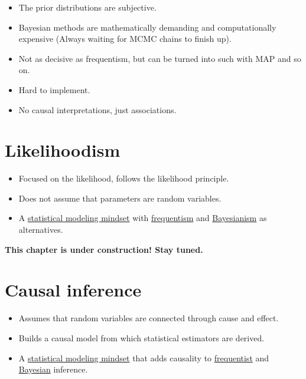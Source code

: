 \documentclass[
  10pt,
]{scrbook}
\providecommand{\tightlist}{%
  \setlength{\itemsep}{0pt}\setlength{\parskip}{0pt}}
\begin{document}
\begin{itemize}
\tightlist
\item
  The prior distributions are subjective.
\item
  Bayesian methods are mathematically demanding and computationally expensive (Always waiting for MCMC chains to finish up).
\item
  Not as decisive as frequentism, but can be turned into such with MAP and so on.
\item
  Hard to implement.
\item
  No causal interpretations, just associations.
\end{itemize}

\hypertarget{likelihoodism}{%
\chapter{Likelihoodism}\label{likelihoodism}}

\begin{itemize}
\tightlist
\item
  Focused on the likelihood, follows the likelihood principle.
\item
  Does not assume that parameters are random variables.\\
\item
  A \protect\hyperlink{statistical-modeling}{statistical modeling mindset} with \protect\hyperlink{frequentism}{frequentism} and \protect\hyperlink{bayesianism}{Bayesianism} as alternatives.
\end{itemize}

\textbf{This chapter is under construction! Stay tuned.}

\hypertarget{causal}{%
\chapter{Causal inference}\label{causal}}

\begin{itemize}
\tightlist
\item
  Assumes that random variables are connected through cause and effect.
\item
  Builds a causal model from which statistical estimators are derived.
\item
  A \protect\hyperlink{statistical-modeling}{statistical modeling mindset} that adds causality to \protect\hyperlink{frequentism}{frequentist} and \protect\hyperlink{bayesian}{Bayesian} inference.
\end{itemize}
\end{document}
